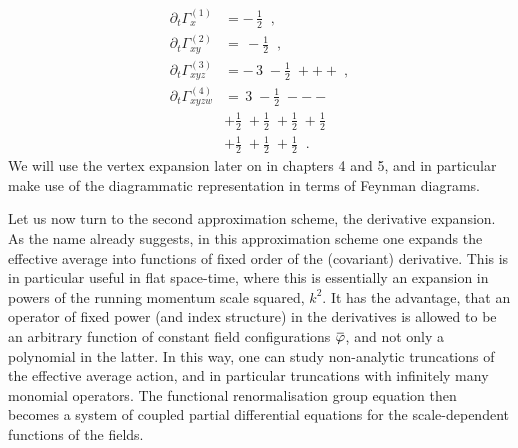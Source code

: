 \documentclass[11pt]{book}
\newcommand{\overbar}[1]{\mkern 1.5mu\overline{\mkern-1.5mu#1\mkern-1.5mu}\mkern 1.5mu}
\newcommand{\bp}{\overbar \varphi}
\numberwithin{equation}{chapter}
\begin{document}
\begin{align}
  \partial_t \Gamma^{(1)}_{x} &=
  - \, \frac12 \;
   \;,
  \label{eq:deriv1} \\
  \partial_t \Gamma^{(2)}_{xy} &=
  \, 
  - \frac12 \;
   \;,
  \label{eq:deriv2} \\
  \partial_t \Gamma^{(3)}_{xyz} &=
  - \, 3 \;
  
  - \frac12 \;
  
  + 
  + 
  + 
  \;,
  \label{eq:deriv3} \\
  \partial_t \Gamma^{(4)}_{xyzw} &=
  \, 3 \; 
  - \frac12 \; 
  - 
  - 
  - 
  \nonumber \\
  &
  + \frac12 \; 
  + \frac12 \; 
  + \frac12 \; 
  + \frac12 \; 
  \nonumber \\[3mm]
  &
  + \frac12 \; 
  + \frac12 \; 
  + \frac12 \; 
  \;.
  \label{eq:deriv4}
\end{align}
We will use the vertex expansion later on in chapters 4 and 5, and
in particular make use of the diagrammatic representation in terms
of Feynman diagrams.

Let us now turn to the second approximation scheme, the derivative expansion.
As the name already suggests, in this approximation scheme one expands the
effective average into functions of fixed order of the (covariant)
derivative. This is in particular useful in flat space-time, where
this is essentially an expansion in powers of the running momentum
scale squared, $k^2$. It has the advantage, that an operator of fixed power
(and index structure) in the derivatives is allowed to be an arbitrary function of
constant field configurations $\bp$, and not only a polynomial in the
latter. In this way, one can study non-analytic truncations of the effective
average action, and in particular truncations with infinitely many
monomial operators. The functional renormalisation group equation
then becomes a system of coupled partial differential equations
for the scale-dependent functions of the fields.
\end{document}
